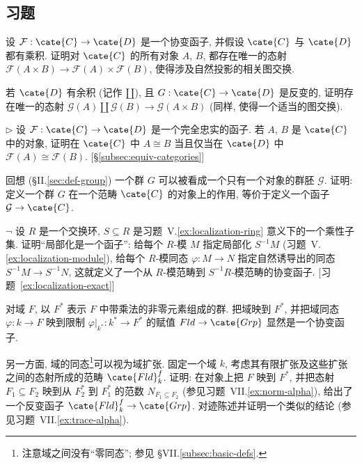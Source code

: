 \subsection*{习题}
{}

\begin{prob}\label{ex:functor-product}
设 $\mathcal{F}:\cate{C}\to\cate{D}$ 是一个协变函子, 并假设 $\cate{C}$ 与 $\cate{D}$ 都有乘积. 证明对 $\cate{C}$ 的所有对象 $A$, $B$, 都存在唯一的态射 $\mathcal{F}(A\times B)\to\mathcal{F}(A)\times\mathcal{F}(B)$, 使得涉及自然投影的相关图交换.

若 $\cate{D}$ 有余积 (记作 $\amalg$), 且 $G:\cate{C}\to\cate{D}$ 是反变的, 证明存在唯一的态射 $\mathcal{G}(A)\amalg\mathcal{G}(B)\to\mathcal{G}(A\times B)$ (同样, 使得一个适当的图交换).
\end{prob}

\begin{prob}\label{ex:fully-faithful-iso}
$\triangleright$ 设 $\mathcal{F}:\cate{C}\to\cate{D}$ 是一个完全忠实的函子. 若 $A$, $B$ 是 $\cate{C}$ 中的对象, 证明在 $\cate{C}$ 中 $A\cong B$ 当且仅当在 $\cate{D}$ 中 $\mathcal{F}(A)\cong\mathcal{F}(B)$. [\S\ref{subsec:equiv-categories}]
\end{prob}

\begin{prob}\label{ex:group-action-functor}
回想 (§II.\ref{sec:def-group}) 一个群 $G$ 可以被看成一个只有一个对象的群胚 $\mathcal{G}$. 证明: 定义一个群 $G$ 在一个范畴 $\cate{C}$ 的对象上的作用, 等价于定义一个函子 $\mathcal{G}\to\cate{C}$.
\end{prob}

\begin{prob}\label{ex:localization-functor}
$\neg$ 设 $R$ 是一个交换环, $S\subseteq R$ 是习题~V.\ref{ex:localization-ring} 意义下的一个乘性子集. 证明``局部化是一个函子'': 给每个 $R$-模 $M$ 指定局部化 $S^{-1}M$ (习题~V.\ref{ex:localization-module}), 给每个 $R$-模同态 $\varphi:M\to N$ 指定自然诱导出的同态 $S^{-1}M\to S^{-1}N$, 这就定义了一个从 $R$-模范畴到 $S^{-1}R$-模范畴的协变函子. [习题~\ref{ex:localization-exact}]
\end{prob}

\begin{prob}\label{ex:field-units-norm}
对域 $F$, 以 $F^{*}$ 表示 $F$ 中带乘法的非零元素组成的群. 把域映到 $F^{*}$, 并把域同态 $\varphi:k\to F$ 映到限制 $\varphi|_{k^{*}}:k^{*}\to F^{*}$ 的赋值 $Fld\to\cate{Grp}$ 显然是一个协变函子.

另一方面, 域的同态\footnote{注意域之间没有``零同态''; 参见 §VII.\ref{subsec:basic-defs}.}可以视为域扩张. 固定一个域 $k$, 考虑其有限扩张及这些扩张之间的态射所成的范畴 $\cate{Fld}_k^f$. 证明: 在对象上把 $F$ 映到 $F^*$, 并把态射 $F_1\subseteq F_2$ 映到从 $F_2^*$ 到 $F_1^*$ 的范数 $N_{F_1\subseteq F_2}$ (参见习题~VII.\ref{ex:norm-alpha}), 给出了一个反变函子 $\cate{Fld}_k^f\to\cate{Grp}$. 对迹陈述并证明一个类似的结论 (参见习题~VII.\ref{ex:trace-alpha}).
\end{prob}

